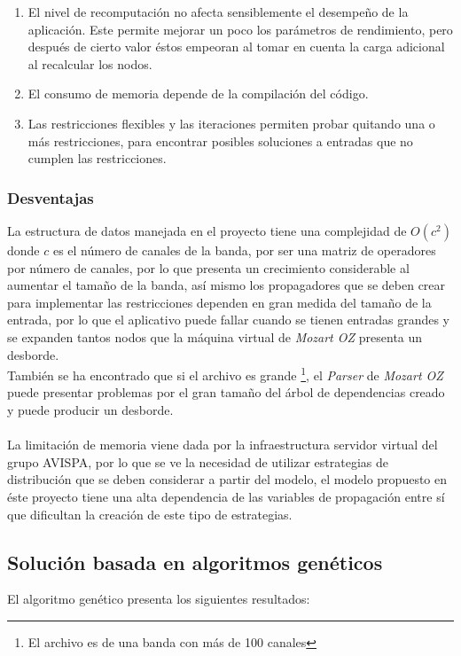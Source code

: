 \begin{enumerate}
	\item El nivel de recomputación no afecta sensiblemente el desempeño de la aplicación. Este permite mejorar un poco los parámetros de rendimiento, pero después de cierto valor éstos empeoran al tomar en cuenta la carga adicional al recalcular los nodos.
	\item El consumo de memoria depende de la compilación del código.
	\item Las restricciones flexibles y las iteraciones permiten probar quitando una o más restricciones, para encontrar posibles soluciones a entradas que no cumplen las restricciones.
\end{enumerate}

\subsubsection{Desventajas}

La estructura de datos manejada en el proyecto tiene una complejidad de $O(c^{2})$ donde $c$ es el número de canales de la banda, por ser una matriz de operadores por número de canales, por lo que presenta un crecimiento considerable al aumentar el tamaño de la banda, así mismo los propagadores que se deben crear para implementar las restricciones dependen en gran medida del tamaño de la entrada, por lo que el aplicativo puede fallar cuando se tienen entradas grandes y se expanden tantos nodos que la máquina virtual de \textit{Mozart OZ} presenta un desborde.\\
También se ha encontrado que si el archivo es grande \footnote{El archivo es de una banda con  más de 100 canales}, el \textit{Parser} de \textit{Mozart OZ} puede presentar problemas por el gran tamaño del árbol de dependencias creado y puede producir un desborde.
\\\\
La limitación de memoria viene dada por la infraestructura servidor virtual del grupo AVISPA, por lo que se ve la necesidad de utilizar estrategias de distribución que se deben considerar a partir del modelo, el modelo propuesto en éste proyecto tiene una alta dependencia de las variables de propagación entre sí que dificultan la creación de este tipo de estrategias.

\subsection{Solución basada en algoritmos genéticos}

El algoritmo genético presenta los siguientes resultados:

